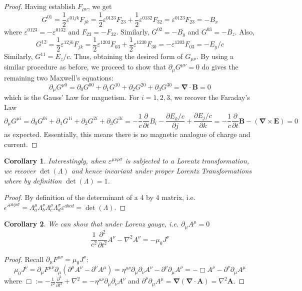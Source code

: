 \documentclass[a4paper]{article}
\theoremstyle{new}
\newtheorem{cor}{Corollary}[section]
\begin{document}
\begin{proof}
Having establish $F_{\mu\nu}$, we get
$$G^{01}=\frac{1}{2}\varepsilon^{01jk}F_{jk}=\frac{1}{2}\varepsilon^{0123}F_{23}+\frac{1}{2}\varepsilon^{0132}F_{32}=\varepsilon^{0123}F_{23}=-B_x$$
where $\varepsilon^{0123}=-\varepsilon^{0132}$ and $F_{23}=-F_{32}$. Similarly, $G^{02}=-B_y$ and $G^{03}=-B_z$. Also,
$$G^{12}=\frac{1}{2}\varepsilon^{12jk}F_{jk}=\frac{1}{2}\varepsilon^{1203}F_{03}+\frac{1}{2}\varepsilon^{1230}F_{30}=-\varepsilon^{1203}F_{03}=-E_y/c$$
Similarly, $G^{11}=E_z/c$. Thus, obtaining the desired form of $G_{\mu\nu}$. By using a similar procedure as before, we proceed to show that $\partial_\mu G^{\mu\nu}=0$ do gives the remaining two Maxwell's equations:
$$\partial_\mu G^{\mu0}=\partial_0G^{00}+\partial_1G^{10}+\partial_2G^{20}+\partial_3G^{30}=\boldsymbol{\nabla}\cdot\mathbf{B}=0$$
which is the Gauss' Law for magnetism. For $i=1,2,3$, we recover the Faraday's Law
$$\partial_\mu G^{\mu i}=\partial_0G^{0i}+\partial_1G^{1i}+\partial_2G^{2i}+\partial_3G^{3i}=-\frac{1}{c}\frac{\partial}{\partial t}B_i-\frac{\partial E_k/c}{\partial j}+\frac{\partial E_j/c}{\partial k}=-\frac{1}{c}\frac{\partial}{\partial t}\mathbf{B}-(\boldsymbol{\nabla}\times\mathbf{E})=0$$
as expected. Essentially, this means there is no magnetic analogue of charge and current.
\end{proof}
\begin{cor}
Interestingly, when $\varepsilon^{\mu\nu\rho\sigma}$ is subjected to a Lorentz transformation, we recover $\det(
\Lambda)$ and hence invariant under proper Lorentz Transformations where by definition $\det(\Lambda)=1$.
\end{cor}
\begin{proof}
By definition of the determinant of a 4 by 4 matrix, i.e. $\epsilon'^{\mu\nu\rho\sigma}=\Lambda_a^\mu\Lambda^\nu_b\Lambda_c^\rho\Lambda_d^\sigma\varepsilon^{abcd}=\det(\Lambda)$. 
\end{proof}
\begin{cor}
We can show that under Lorenz gauge, i.e. $\partial_\mu A^\mu=0$
$$\frac{1}{c^2}\frac{\partial^2}{\partial t^2}A^\nu-\nabla^2A^\nu=-\mu_0J^\nu$$
\end{cor}
\begin{proof}
Recall $\partial_\mu F^{\mu\nu}=\mu_0J^\nu$:
$$\mu_0J^\nu=\partial_\mu F^{\mu\nu}\partial_\mu(\partial^\mu A^\nu-\partial^\nu A^\mu)=\eta^{\mu\nu}\partial_\mu\partial_\nu A^\nu-\partial^\nu\partial_\mu A^\nu=-\Box A^\nu-\partial^\nu\partial_\mu A^\mu$$
where $\Box:=-\frac{1}{c^2}\frac{\partial^2}{\partial t^2}+\nabla^2=-\eta^{\mu\nu}\partial_\mu\partial_\nu A^\nu$ and $\partial^\nu\partial_\mu A^\mu=\boldsymbol{\nabla}(\boldsymbol{\nabla}\cdot\mathbf{A})=\nabla^2\mathbf{A}$.
\end{proof}
\end{document}
